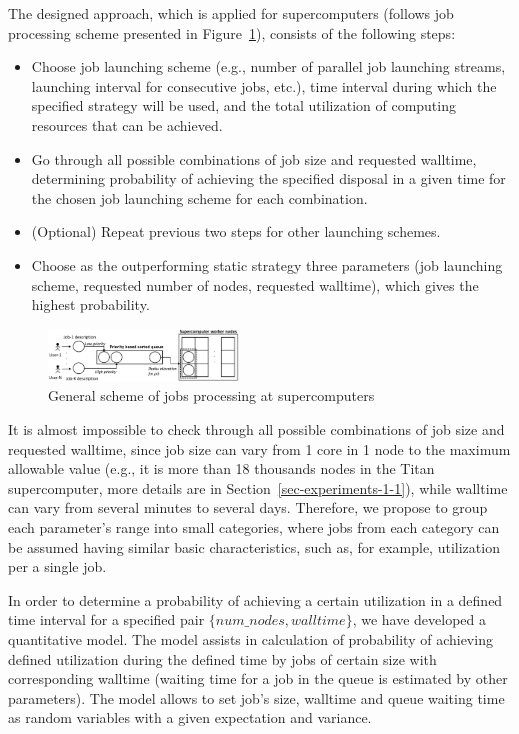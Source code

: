 The designed approach, which is applied for supercomputers (follows job
processing scheme presented in
Figure~\ref{fig-job-processing-general-scheme}), consists of the following
steps:
\begin{itemize}
    \item Choose job launching scheme (e.g., number of parallel job
    launching streams, launching interval for consecutive jobs, etc.), time
    interval during which the specified strategy will be used, and the total
    utilization of computing resources that can be achieved.
    \item Go through all possible combinations of job size and requested
    walltime, determining probability of achieving the specified disposal in
    a given time for the chosen job launching scheme for each combination.
    \item (Optional) Repeat previous two steps for other launching schemes.
    \item Choose as the outperforming static strategy three parameters (job
    launching scheme, requested number of nodes, requested walltime), which
    gives the highest probability.
\end{itemize}

\begin{figure}
    \centering
    \includegraphics[width=0.45\textwidth]{pics/job-processing-general-scheme.png}
    \caption{General scheme of jobs processing at supercomputers}
    \label{fig-job-processing-general-scheme} 
\end{figure}

It is almost impossible to check through all possible combinations of job
size and requested walltime, since job size can vary from 1 core in 1 node
to the maximum allowable value (e.g., it is more than 18 thousands nodes in
the Titan supercomputer, more details are in
Section~\ref{sec-experiments-1-1}), while walltime can vary from several
minutes to several days. Therefore, we propose to group each parameter's
range into small categories, where jobs from each category can be assumed having
similar basic characteristics, such as, for example, utilization per a
single job.

In order to determine a probability of achieving a certain utilization in a
defined time interval for a specified pair $\{num\_nodes, walltime\}$, we
have developed a quantitative model. The model assists in calculation of
probability of achieving defined utilization during the defined time by jobs
of certain size with corresponding walltime (waiting time for a job in the
queue is estimated by other parameters). The model allows to set job's size,
walltime and queue waiting time as random variables with a given expectation
and variance.

